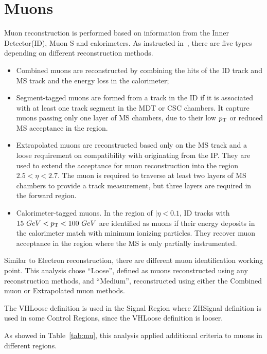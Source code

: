 \section{Muons}
\label{sec:mu}
\par Muon reconstruction is performed based on information from the Inner Detector(ID), Muon S and calorimeters. As instructed in~\cite{Aad:2016jkr}, 
there are five types depending on different reconstruction methods.

\begin{itemize}
\item Combined muons are reconstructed by combining the hits of the ID track and MS track and the energy loss in the calorimeter;
\item Segment-tagged muons are formed from a track in the ID if it is associated with at least one track segment in the MDT or CSC chambers. 
 It capture muons passing only one layer of MS chambers, due to their low $p_{\mathrm{T}}$ or reduced MS acceptance in the region.
\item Extrapolated muons are reconstructed based only on the MS track and a loose requirement on compatibility with originating from the IP. 
 They are used to extend the acceptance for muon reconstruction into the region $2.5 <\eta< 2.7$. 
  The muon is required to traverse at least two layers of MS chambers to provide a track measurement, but three layers are required in the forward region.

\item Calorimeter-tagged muons. In the region of $|\eta< 0.1$, ID tracks with $15 ~GeV < p_{\mathrm{T}} < 100 ~GeV$ are identified as muons if their energy deposits in the calorimeter 
 match with minimum ionizing particles. They recover muon acceptance in the region where the MS is only partially instrumented.

\end{itemize}
\par Similar to Electron reconstruction, there are different muon identification working point. This analysis chose ``Loose'', defined as muons reconstructed using any reconstruction methods, 
and ``Medium'', reconstructed using either the Combined muon or Extrapolated muon methods.
\par The VHLoose definition is used in the Signal Region where ZHSignal definition is used in some Control Regions, since the VHLoose definition is looser.					
\par As showed in Table~\ref{tab:mu}, this analysis applied additional criteria to muons in different regions. 
